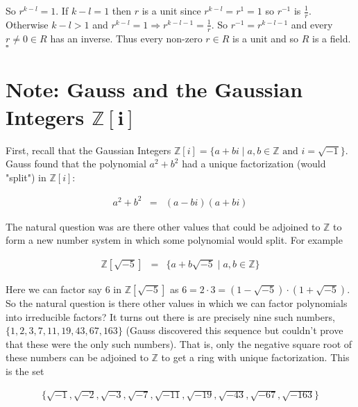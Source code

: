 \documentclass[11pt, oneside]{article}   	%
\theoremstyle{definition}
\begin{document}
\bigskip
\noindent
So $ r^{k-l} = 1 $. If $k-l = 1$ then $r$ is a unit since $r^{k-l} = r^{1} = 1$ so $r^{-1}$ is $\frac{1}{r}$. Otherwise
$k-l > 1$ and $r^{k-l} = 1 \Rightarrow r^{k-l-1} = \frac{1}{r}$.   So $r^{-1} = r^{k-l -1}$ and 
every $r \neq 0 \in R$ has an inverse. Thus every non-zero  $r \in R$ is a unit and so $R$ is a field. $\square$


\section{Note: Gauss and the Gaussian Integers $\boldsymbol{\mathbb{Z}[i]}$}
First, recall that the Gaussian Integers  $\mathbb{Z}[i] = \{a + bi \mid  a,b \in \mathbb{Z} \text{ and } i = \sqrt{-1} \}$. 
Gauss found that the polynomial $a^2 + b^2$ had a unique factorization (would "split") in $\mathbb{Z}[i]$: 


\begin{equation*}
\begin{array}{rlll} 
a^2 + b^2 
&=&  (a - bi)(a + bi)
\end{array}
\end{equation*}

\bigskip
\noindent
The natural question was are there other values that could be adjoined to $\mathbb{Z}$ to form a new number 
system in which some polynomial would split. For example

\begin{equation*}
\begin{array}{rlll} 
\mathbb{Z}[\sqrt{-5}]
&=& \{a+b\sqrt{-5}  \mid a,b \in \mathbb{Z}\}
\end{array}
\end{equation*}

\bigskip
\noindent 
Here we can factor say $6$ in $\mathbb{Z}[\sqrt{-5}]$ as $6 = 2 \cdot 3 = (1 - \sqrt{-5}) \cdot (1 + \sqrt{-5})$. So the natural question
is there other values in which we can factor polynomials into irreducible factors? It turns out there 
is are precisely nine such numbers, $\{1,2,3,7,11,19,43,67,163\}$ (Gauss discovered this sequence but couldn't prove that these were 
the only such numbers). That is, only the negative square root of these numbers can be adjoined to  $\mathbb{Z}$ to get a ring with 
unique factorization. This is the set

\begin{equation*}
\begin{array}{rlll} 
\{\sqrt{-1}, \sqrt{-2}, \sqrt{-3},  \sqrt{-7}, \sqrt{-11}, \sqrt{-19}, \sqrt{-43}, \sqrt{-67}, \sqrt{-163}\}
\end{array}
\end{equation*}
\end{document}

